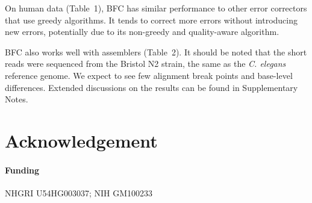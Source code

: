 \documentclass{bioinfo}
\begin{document}
On human data (Table~1), BFC has similar performance to other error correctors
that use greedy algorithms. It tends to correct more errors without introducing
new errors, potentially due to its non-greedy and quality-aware algorithm.

BFC also works well with assemblers (Table~2). It should be noted
that the short reads were sequenced from the Bristol N2 strain, the same as the
{\it C. elegans} reference genome. We expect to see few alignment break points
and base-level differences. Extended discussions on the results can be found in
Supplementary Notes.

%
%


\section*{Acknowledgement}
\paragraph{Funding\textcolon} NHGRI U54HG003037; NIH GM100233


\end{document}
